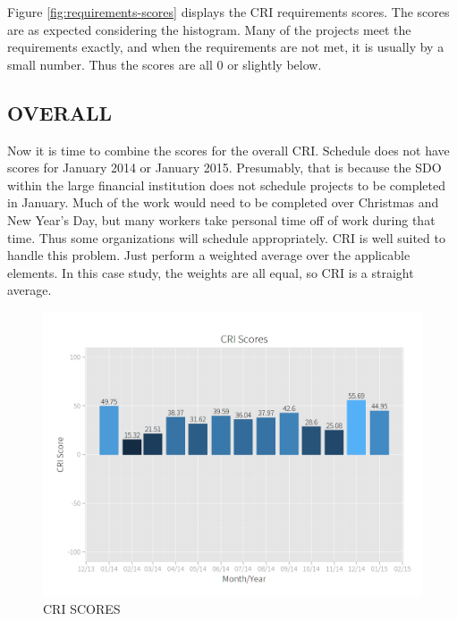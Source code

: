 \documentclass[SDSUThesis.tex]{subfiles}
\begin{document}
        Figure \ref{fig:requirements-scores} displays the CRI requirements
        scores. The scores are as expected considering the histogram. Many
        of the projects meet the requirements exactly, and when the requirements
        are not met, it is usually by a small number.
        Thus the scores are all 0 or slightly below.
        
    \subsection{OVERALL}
        Now it is time to combine the scores for the overall CRI.
        Schedule does not have scores for January 2014 or January 2015.
        Presumably, that is because the SDO within the large financial institution
        does not schedule projects to be completed in January. Much of the work
        would need to be completed over Christmas and New Year's Day, but many
        workers take personal time off of work during that time.  Thus some
        organizations will schedule appropriately.  CRI is well suited to
        handle this problem.  Just perform a weighted average over the
        applicable elements.  In this case study, the weights are all equal,
        so CRI is a straight average.  
        
        \begin{figure}[hbt]
            \centering
            \includegraphics[scale=.28]{images/cri_scores.png}
            \caption{CRI SCORES}
            \label{fig:cri-scores}
        \end{figure}
        
\end{document}
